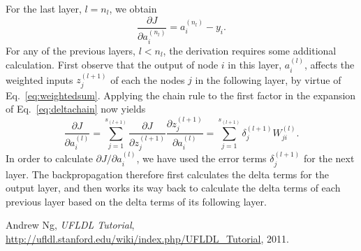 \documentclass{article}
\begin{document}
For the last layer, $l=n_l$, we obtain
\begin{equation}
\frac{\partial J}{\partial a_i^{(n_l)}} = a_i^{(n_l)} - y_i.
\end{equation}
For any of the previous layers, $l<n_l$, the derivation requires some additional calculation. First observe that the output of node $i$ in this layer, $a_i^{(l)}$, affects the weighted inputs $z_j^{(l+1)}$ of each the nodes $j$ in the following layer, by virtue of Eq.~\eqref{eq:weightedsum}. Applying the chain rule to the first factor in the expansion of Eq.~\eqref{eq:deltachain} now yields
\begin{equation}
\frac{\partial J}{\partial a_i^{(l)}} = \sum_{j=1}^{s_{(l+1)}} \frac{\partial J}{\partial z_j^{(l+1)}} \frac{\partial z_j^{(l+1)}}{\partial a_i^{(l)}} = \sum_{j=1}^{s_{(l+1)}} \delta_j^{(l+1)} W_{ji}^{(l)}.
\end{equation}
In order to calculate $\partial J / \partial a_i^{(l)}$, we have used the error terms $\delta_j^{(l+1)}$ for the next layer. The backpropagation therefore first calculates the delta terms for the output layer, and then works its way back to calculate the delta terms of each previous layer based on the delta terms of its following layer.





\begin{thebibliography}{1}

 Andrew Ng, {\em UFLDL Tutorial}, \url{http://ufldl.stanford.edu/wiki/index.php/UFLDL_Tutorial}, 2011.

\end{thebibliography}
\end{document}
